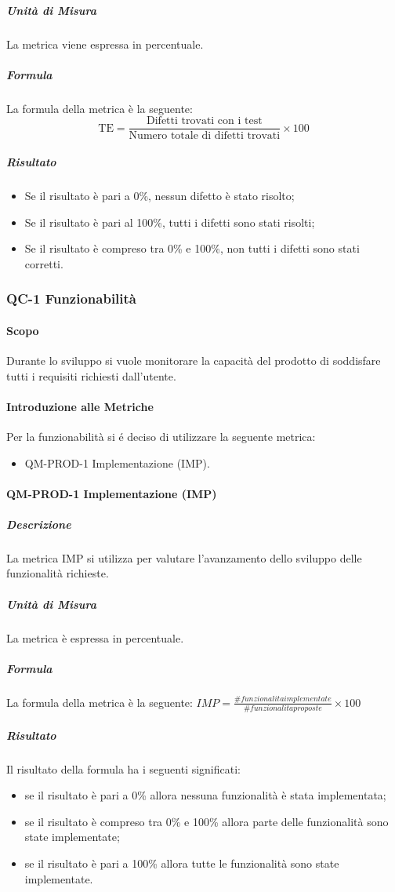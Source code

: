 			\subparagraph{Unità di Misura}
			La metrica viene espressa in percentuale.

			\subparagraph{Formula}
			La formula della metrica è la seguente:
			\[
				\text{TE} = \frac{\text{Difetti trovati con i test}}{\text{Numero totale di difetti trovati}} \times 100
			\]

			\subparagraph{Risultato}
			\begin{itemize}
				\item Se il risultato è pari a 0\%, nessun difetto è stato risolto;
				\item Se il risultato è pari al 100\%, tutti i difetti sono stati risolti;
				\item Se il risultato è compreso tra 0\% e 100\%, non tutti i difetti sono stati corretti.
			\end{itemize}

	\subsubsection{QC-1 Funzionabilità}
		\paragraph{Scopo}
			Durante lo sviluppo si vuole monitorare la capacità del prodotto di soddisfare tutti i requisiti richiesti dall'utente.
		\paragraph{Introduzione alle Metriche}
			Per la funzionabilità si é deciso di utilizzare la seguente metrica:
			\begin{itemize}
				\item QM-PROD-1 Implementazione (IMP).
			\end{itemize}
		\paragraph{QM-PROD-1 Implementazione (IMP)}
			\subparagraph{Descrizione}
				La metrica IMP si utilizza per valutare l'avanzamento dello sviluppo delle funzionalità richieste.
			\subparagraph{Unità di Misura}
				La metrica è espressa in percentuale.
			\subparagraph{Formula}
				La formula della metrica è la seguente:
				\(
					IMP = \frac{\# funzionalita implementate}{\# funzionalita proposte}\times100
				\)
			\subparagraph{Risultato}
				Il risultato della formula ha i seguenti significati:
				\begin{itemize}
					\item se il risultato è pari a 0\% allora nessuna funzionalità è stata implementata;
					\item se il risultato è compreso tra 0\% e 100\% allora parte delle funzionalità sono state implementate;
					\item se il risultato è pari a 100\% allora tutte le funzionalità sono state implementate.
				\end{itemize}

